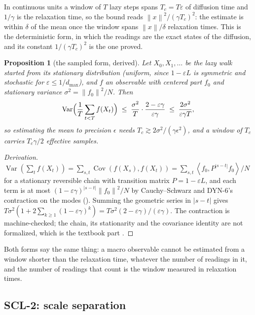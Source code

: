 \documentclass[11pt,a4paper]{article}
\theoremstyle{plain}
\newtheorem{proposition}[theorem]{Proposition}
\theoremstyle{definition}
\theoremstyle{remark}
\newcommand{\norm}[1]{\left\lVert #1 \right\rVert}
\newcommand{\abs}[1]{\left\lvert #1 \right\rvert}
\newcommand{\ip}[2]{\left\langle #1, #2 \right\rangle}
\newcommand{\lean}[1]{\path{#1}}
\DeclareMathOperator{\Var}{Var}
\DeclareMathOperator{\Cov}{Cov}
\begin{document}
In continuous units a window of $T$ lazy steps spans $T_c = T\varepsilon$ of diffusion time and
$1/\gamma$ is the relaxation time, so the bound reads $\norm{x}^2/(\gamma T_c)^2$: the estimate is
within $\delta$ of the mean once the window spans $\norm{x}/\delta$ relaxation times. This is the
deterministic form, in which the readings are the exact states of the diffusion, and its constant
$1/(\gamma T_c)^2$ is the one proved.

\begin{proposition}[the sampled form, derived]\label{prop:sampled}
Let $X_0, X_1, \dots$ be the lazy walk started from its stationary distribution (uniform, since
$1-\varepsilon L$ is symmetric and stochastic for $\varepsilon \le 1/d_{\max}$), and $f$ an observable with
centered part $f_0$ and stationary variance $\sigma^2 = \norm{f_0}^2/N$. Then
\[
  \Var\Bigl(\frac{1}{T}\sum_{t<T} f(X_t)\Bigr)
  \;\le\; \frac{\sigma^2}{T}\cdot\frac{2-\varepsilon\gamma}{\varepsilon\gamma}
  \;\le\; \frac{2\sigma^2}{\varepsilon\gamma T},
\]
so estimating the mean to precision $\epsilon$ needs $T_c \gtrsim 2\sigma^2/(\gamma\epsilon^2)$, and
a window of $T_c$ carries $T_c\gamma/2$ effective samples.
\end{proposition}

\begin{proof}[Derivation]
$\Var(\sum_t f(X_t)) = \sum_{s,t}\Cov(f(X_s), f(X_t)) = \sum_{s,t}\ip{f_0}{P^{\abs{s-t}} f_0}/N$ for
a stationary reversible chain with transition matrix $P = 1 - \varepsilon L$, and each term is at most
$(1-\varepsilon\gamma)^{\abs{s-t}}\norm{f_0}^2/N$ by Cauchy--Schwarz and DYN-6's contraction on the
modes (\lean{lazy\_pow\_energy\_le}). Summing the geometric series in $\abs{s-t}$ gives
$T\sigma^2(1 + 2\sum_{k \ge 1}(1-\varepsilon\gamma)^k) = T\sigma^2(2-\varepsilon\gamma)/(\varepsilon\gamma)$. The
contraction is machine-checked; the chain, its stationarity and the covariance identity are not
formalized, which is the textbook part \cite{aldous2002reversible,levin2017mixing}.
\end{proof}

Both forms say the same thing: a macro observable cannot be estimated from a window shorter than
the relaxation time, whatever the number of readings in it, and the number of readings that count
is the window measured in relaxation times.

\subsection{SCL-2: scale separation}
\end{document}
